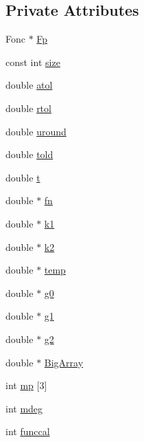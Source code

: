 \subsection*{Private Attributes}
\begin{DoxyCompactItemize}
\item 
Fonc $\ast$ \hyperlink{classodes_1_1Rock4L_a08b68188749f874241a8ec9026a3cb4e}{Fp}
\item 
const int \hyperlink{classodes_1_1Rock4L_a656df90cfccb64f435ff8e0c4d49c159}{size}
\item 
double \hyperlink{classodes_1_1Rock4L_ae411684888f3342a131797bce0cad7d7}{atol}
\item 
double \hyperlink{classodes_1_1Rock4L_a7702a7a0b70bfb0b452a3f6f5d53c9a0}{rtol}
\item 
double \hyperlink{classodes_1_1Rock4L_a8d7ea8a9a5554e5f5e7dc323dc5f4060}{uround}
\item 
double \hyperlink{classodes_1_1Rock4L_a7991102ddcd6abc28c1e432774acc0cd}{told}
\item 
double \hyperlink{classodes_1_1Rock4L_a856ed411947dd6a6162c822618dccd99}{t}
\item 
double $\ast$ \hyperlink{classodes_1_1Rock4L_a3f71f2c280eff3e4433c7ce6e62fa9ef}{fn}
\item 
double $\ast$ \hyperlink{classodes_1_1Rock4L_a1d9c7c879e41b0d60d3b18c05aa8ae49}{k1}
\item 
double $\ast$ \hyperlink{classodes_1_1Rock4L_a794fc4a942e72460fb8dbce83fe191d1}{k2}
\item 
double $\ast$ \hyperlink{classodes_1_1Rock4L_acd73674b60301f945cb5f2d3e45ffbb9}{temp}
\item 
double $\ast$ \hyperlink{classodes_1_1Rock4L_a932667ae7d13758c5d2fd1eec72fd0f1}{g0}
\item 
double $\ast$ \hyperlink{classodes_1_1Rock4L_aa4175c5f417df3a94536932f085e6a53}{g1}
\item 
double $\ast$ \hyperlink{classodes_1_1Rock4L_ae54c397e14b9def73420e3e52cb4f4f7}{g2}
\item 
double $\ast$ \hyperlink{classodes_1_1Rock4L_a41d6a3f04401f593191a7f8031dff97c}{Big\-Array}
\item 
int \hyperlink{classodes_1_1Rock4L_a217bad32652adff95b084deea4b05d2e}{mp} \mbox{[}3\mbox{]}
\item 
int \hyperlink{classodes_1_1Rock4L_af7dc55d28288c0d21d8be9a21ec476a0}{mdeg}
\item 
int \hyperlink{classodes_1_1Rock4L_ad9710df5faa666ea714544750c242f41}{funccal}
\item 

\end{DoxyCompactItemize}
